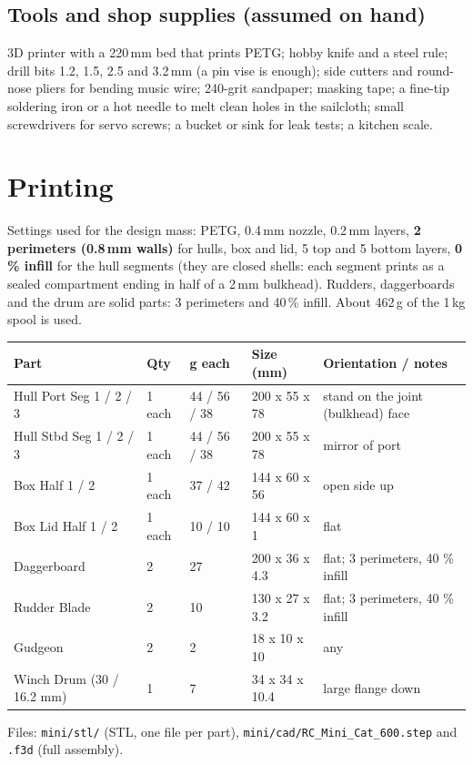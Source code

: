 \documentclass[11pt]{article}
\begin{document}
\subsection*{Tools and shop supplies (assumed on hand)}
3D printer with a 220\,mm bed that prints PETG; hobby knife and a steel rule; drill bits 1.2, 1.5, 2.5 and 3.2\,mm (a pin vise is enough); side cutters and round-nose pliers for bending music wire; 240-grit sandpaper; masking tape; a fine-tip soldering iron or a hot needle to melt clean holes in the sailcloth; small screwdrivers for servo screws; a bucket or sink for leak tests; a kitchen scale.

\section{Printing}
Settings used for the design mass: PETG, 0.4\,mm nozzle, 0.2\,mm layers, \textbf{2 perimeters (0.8\,mm walls)} for hulls, box and lid, 5 top and 5 bottom layers, \textbf{0\,\% infill} for the hull segments (they are closed shells: each segment prints as a sealed compartment ending in half of a 2\,mm bulkhead). Rudders, daggerboards and the drum are solid parts: 3 perimeters and 40\,\% infill. About 462\,g of the 1\,kg spool is used.
\begin{center}
{\small
\begin{tabular}{lllll}
\toprule
\textbf{Part} & \textbf{Qty} & \textbf{g each} & \textbf{Size (mm)} & \textbf{Orientation / notes} \\
\midrule
Hull Port Seg 1 / 2 / 3 & 1 each & 44 / 56 / 38 & 200 x 55 x 78 & stand on the joint (bulkhead) face \\
Hull Stbd Seg 1 / 2 / 3 & 1 each & 44 / 56 / 38 & 200 x 55 x 78 & mirror of port \\
Box Half 1 / 2 & 1 each & 37 / 42 & 144 x 60 x 56 & open side up \\
Box Lid Half 1 / 2 & 1 each & 10 / 10 & 144 x 60 x 1 & flat \\
Daggerboard & 2 & 27 & 200 x 36 x 4.3 & flat; 3 perimeters, 40 \% infill \\
Rudder Blade & 2 & 10 & 130 x 27 x 3.2 & flat; 3 perimeters, 40 \% infill \\
Gudgeon & 2 & 2 & 18 x 10 x 10 & any \\
Winch Drum (30 / 16.2 mm) & 1 & 7 & 34 x 34 x 10.4 & large flange down \\
\bottomrule
\end{tabular}}
\end{center}
Files: \texttt{mini/stl/} (STL, one file per part), \texttt{mini/cad/RC\_Mini\_Cat\_600.step} and \texttt{.f3d} (full assembly).
\end{document}
